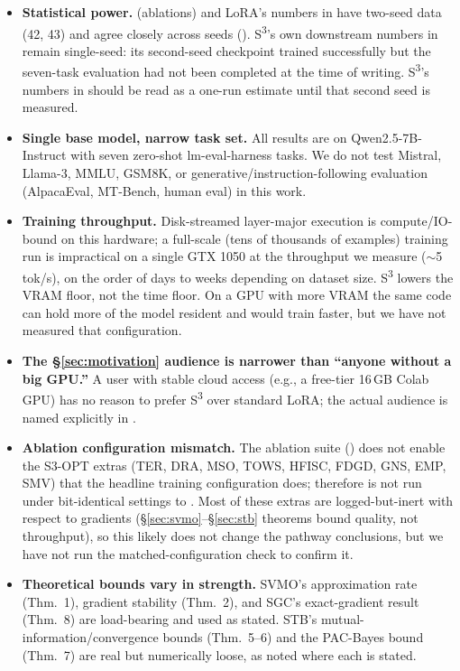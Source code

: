 \documentclass{scpe}
\newcommand{\sthree}{S\textsuperscript{3}}
\begin{document}
\begin{itemize}[leftmargin=*]
    \item \textbf{Statistical power.}  (ablations) and LoRA's numbers in  have two-seed data (42, 43) and agree closely across seeds (). \sthree{}'s own downstream numbers in  remain single-seed: its second-seed checkpoint trained successfully but the seven-task evaluation had not been completed at the time of writing. \sthree{}'s numbers in  should be read as a one-run estimate until that second seed is measured.
    \item \textbf{Single base model, narrow task set.} All results are on Qwen2.5-7B-Instruct with seven zero-shot lm-eval-harness tasks. We do not test Mistral, Llama-3, MMLU, GSM8K, or generative/instruction-following evaluation (AlpacaEval, MT-Bench, human eval) in this work.
    \item \textbf{Training throughput.} Disk-streamed layer-major execution is compute/IO-bound on this hardware; a full-scale (tens of thousands of examples) training run is impractical on a single GTX 1050 at the throughput we measure ($\sim$5 tok/s), on the order of days to weeks depending on dataset size. \sthree{} lowers the VRAM floor, not the time floor. On a GPU with more VRAM the same code can hold more of the model resident and would train faster, but we have not measured that configuration.
    \item \textbf{The \S\ref{sec:motivation} audience is narrower than ``anyone without a big GPU.''} A user with stable cloud access (e.g., a free-tier 16\,GB Colab GPU) has no reason to prefer \sthree{} over standard LoRA; the actual audience is named explicitly in .
    \item \textbf{Ablation configuration mismatch.} The ablation suite () does not enable the S3-OPT extras (TER, DRA, MSO, TOWS, HFISC, FDGD, GNS, EMP, SMV) that the headline training configuration does;  therefore is not run under bit-identical settings to . Most of these extras are logged-but-inert with respect to gradients (\S\ref{sec:svmo}--\S\ref{sec:stb} theorems bound quality, not throughput), so this likely does not change the pathway conclusions, but we have not run the matched-configuration check to confirm it.
    \item \textbf{Theoretical bounds vary in strength.} SVMO's approximation rate (Thm.~1), gradient stability (Thm.~2), and SGC's exact-gradient result (Thm.~8) are load-bearing and used as stated. STB's mutual-information/convergence bounds (Thm.~5--6) and the PAC-Bayes bound (Thm.~7) are real but numerically loose, as noted where each is stated.
\end{itemize}
\end{document}
